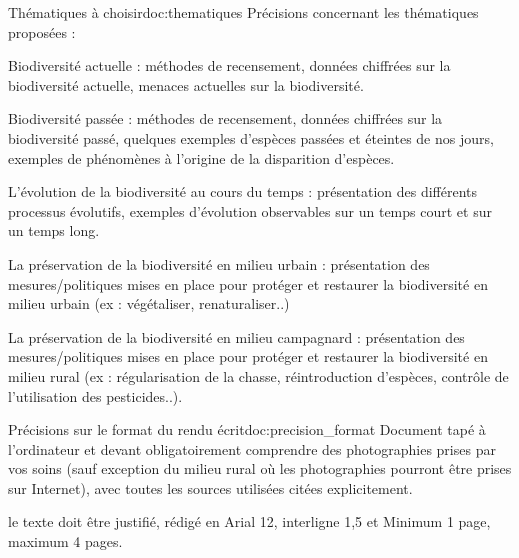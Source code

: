 \begin{doc}{Thématiques à choisir}{doc:thematiques}
Précisions concernant les thématiques proposées :
\begin{listePoints}
    
\item Biodiversité actuelle : méthodes de recensement, données chiffrées sur la biodiversité actuelle, menaces actuelles sur la biodiversité.
\item Biodiversité passée : méthodes de recensement, données chiffrées sur la biodiversité passé, quelques exemples d’espèces passées et éteintes de nos jours, exemples de phénomènes à l’origine de la disparition d’espèces.
\item L’évolution de la biodiversité au cours du temps : présentation des différents processus évolutifs, exemples d’évolution observables sur un temps court et sur un temps long.
\item La préservation de la biodiversité en milieu urbain : présentation des mesures/politiques mises en place pour protéger et restaurer la biodiversité en milieu urbain (ex : végétaliser, renaturaliser..)
\item La préservation de la biodiversité en milieu campagnard :  présentation des mesures/politiques mises en place pour protéger et restaurer la biodiversité en milieu rural (ex : régularisation de la chasse, réintroduction d’espèces, contrôle de l’utilisation des pesticides..).
\end{listePoints}
\end{doc}

\begin{doc}{Précisions sur le format du rendu écrit}{doc:precision_format}
Document tapé à l’ordinateur et devant obligatoirement comprendre des photographies prises par vos soins (sauf exception du milieu rural où les photographies pourront être prises sur Internet), avec toutes les sources utilisées citées explicitement.

 le texte doit être justifié, rédigé en Arial 12, interligne 1,5 et  Minimum 1 page, maximum 4 pages.
\end{doc}